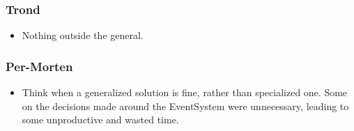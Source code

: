 \documentclass{article}
\begin{document}
\subsubsection*{Trond}
\begin{itemize}
    \item 
    Nothing outside the general.
\end{itemize}

\subsubsection*{Per-Morten}
\begin{itemize}
    \item
    Think when a generalized solution is fine, rather than specialized one. 
    Some on the decisions made around the EventSystem were unnecessary, 
    leading to some unproductive and wasted time.
\end{itemize}
\end{document}

